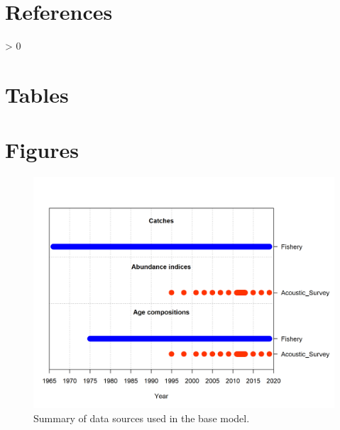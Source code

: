 \documentclass[11pt,
  english,
  a4paper,
]{article}
\newlength{\cslhangindent}
\newenvironment{CSLReferences}[2] %
 {%
  \setlength{\parindent}{0pt}
  \ifodd #1 \everypar{\setlength{\hangindent}{\cslhangindent}}\ignorespaces\fi
  \ifnum #2 > 0
  \setlength{\parskip}{#2\baselineskip}
  \fi
 }%
 {}
\begin{document}

\hypertarget{references}{%
\section{References}\label{references}}

\leavevmode\tagmcend\tagstructend


\hypertarget{refs}{}
\begin{CSLReferences}{0}{0}
\end{CSLReferences}

\leavevmode\tagmcend\tagstructend


\hypertarget{tables}{%
\section{Tables}\label{tables}}

\leavevmode\tagmcend\tagstructend


\hypertarget{figures}{%
\section{Figures}\label{figures}}

\leavevmode\tagmcend\tagstructend


\begin{figure}
\centering
\includegraphics[width=1\textwidth,height=1\textheight]{data-plot.png}
\caption{Summary of data sources used in the base model.\label{fig:data-plot}}
\end{figure}
\end{document}
